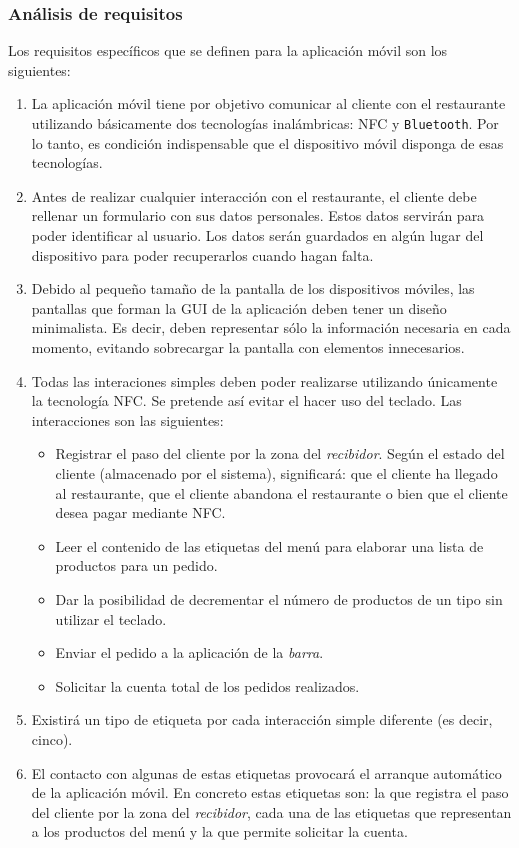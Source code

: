 \subsubsection{Análisis de requisitos}
Los requisitos específicos que se definen para la aplicación móvil son los
siguientes:
\begin{enumerate}
\item La aplicación móvil tiene por objetivo comunicar al cliente con el
restaurante utilizando básicamente dos tecnologías inalámbricas: \acs{NFC} y
\texttt{Bluetooth}. Por lo tanto, es condición indispensable que el dispositivo
móvil disponga de esas tecnologías.
\item Antes de realizar cualquier interacción con el restaurante, el cliente
debe rellenar un formulario con sus datos personales. Estos datos servirán para 
poder identificar al usuario. Los datos serán guardados en algún lugar del
dispositivo para poder recuperarlos cuando hagan falta.
\item Debido al pequeño tamaño de la pantalla de los dispositivos móviles, las 
pantallas que forman la \acs{GUI} de la aplicación deben tener un diseño 
minimalista. Es decir, deben representar sólo la información necesaria en cada
momento, evitando sobrecargar la pantalla con elementos innecesarios.
\item Todas las interaciones simples deben poder realizarse utilizando
únicamente la tecnología \acs{NFC}. Se pretende así evitar el hacer uso del
teclado. Las interacciones son las siguientes:
  \begin{itemize}
  \item Registrar el paso del cliente por la zona del \emph{recibidor}.
  Según el estado del cliente (almacenado por el sistema), significará: que
  el cliente ha llegado al restaurante, que el cliente abandona el restaurante
  o bien que el cliente desea pagar mediante \acs{NFC}.
  \item Leer el contenido de las etiquetas del menú para elaborar una lista
  de productos para un pedido.
  \item Dar la posibilidad de decrementar el número de productos de un tipo
  sin utilizar el teclado.
  \item Enviar el pedido a la aplicación de la \emph{barra}.
  \item Solicitar la cuenta total de los pedidos realizados.
  \end{itemize}
\item Existirá un tipo de etiqueta por cada interacción simple diferente
(es decir, cinco).
\item El contacto con algunas de estas etiquetas provocará el arranque
automático de la aplicación móvil. En concreto estas etiquetas son: la que
registra el paso del cliente por la zona del \emph{recibidor}, cada una de las
etiquetas que representan a los productos del menú y la que permite solicitar
la cuenta.
\end{enumerate}
\newpage
